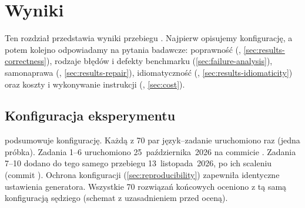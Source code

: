 \chapter{Wyniki}
\label{ch:results}

Ten rozdział przedstawia wyniki przebiegu . Najpierw opisujemy konfigurację, a potem
kolejno odpowiadamy na pytania badawcze: poprawność (, \cref{sec:results-correctness}),
rodzaje błędów i defekty benchmarku (\cref{sec:failure-analysis}), samonaprawa (,
\cref{sec:results-repair}), idiomatyczność (, \cref{sec:results-idiomaticity}) oraz koszty
i wykonywanie instrukcji (, \cref{sec:cost}).

\section{Konfiguracja eksperymentu}
\label{sec:setup}

 podsumowuje konfigurację. Każdą z 70 par język--zadanie uruchomiono raz (jedna
próbka). Zadania 1--6 uruchomiono 25~października~2026 na commicie . Zadania 7--10
dodano do tego samego przebiegu 13~listopada~2026, po ich scaleniu (commit ). Ochrona
konfiguracji (\cref{sec:reproducibility}) zapewniła identyczne ustawienia generatora. Wszystkie 70
rozwiązań końcowych oceniono z tą samą konfiguracją sędziego (schemat z uzasadnieniem przed
oceną).

